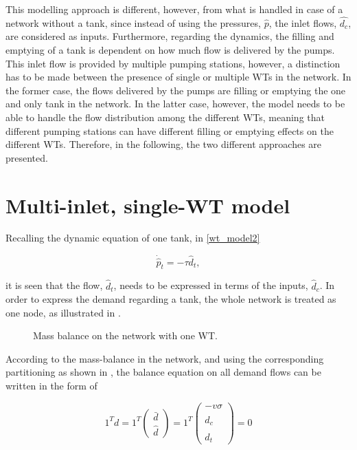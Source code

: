 This modelling approach is different, however,  from what is handled in case of a network without a tank, since instead of using the pressures, $\hat{p}$, the inlet flows, $\hat{d_c}$, are considered as inputs. Furthermore, regarding the dynamics, the filling and emptying of a tank is dependent on how much flow is delivered by the pumps. This inlet flow is provided by multiple pumping stations, however, a distinction has to be made between the presence of single or multiple WTs in the network. In the former case, the flows delivered by the pumps are filling or emptying the one and only tank in the network. In the latter case, however, the model needs to be able to handle the flow distribution among the different WTs, meaning that different pumping stations can have different filling or emptying effects on the different WTs. Therefore, in the following, the two different approaches are presented. 


\section{Multi-inlet, single-WT model}
\label{multi_inlet_single_WT_model}

Recalling the dynamic equation of one tank, in \eqref{wt_model2}

\begin{equation}
\label{wt_model_demand1}
\dot{\hat{p}}_{t} = -\tau \hat{d}_{t},
\end{equation}

it is seen that the flow, $\hat{d}_t$, needs to be expressed in terms of the inputs, $\hat{d}_c$. In order to express the demand regarding a tank, the whole network is treated as one node, as illustrated in . 

\begin{figure}[H]
\centering
 
\caption{Mass balance on the network with one WT.}
\label{fig:onenode_system}
\end{figure}
\vspace{-3mm}

According to the mass-balance in the network, and using the corresponding partitioning as shown in , the balance equation on all demand flows can be written in the form of

\begin{equation}
\label{massbalance_model2}
1^Td 
 =
 1^T
\begin{pmatrix} 
\bar{d} \\
\hat{d}
\end{pmatrix}
=
1^T
\begin{pmatrix} 
-v \sigma \\
\hat{d}_c \\
\hat{d}_t 
\end{pmatrix}
=
0
\end{equation}

